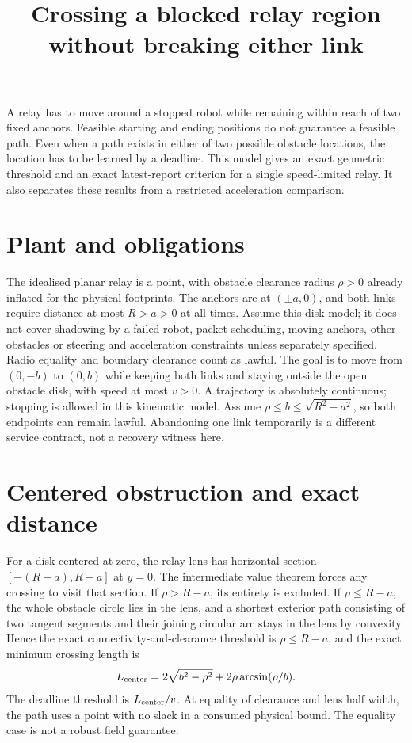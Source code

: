 \documentclass[11pt]{article}
\title{Crossing a blocked relay region without breaking either link}
\date{}
\begin{document}
\maketitle

A relay has to move around a stopped robot while remaining within reach
of two fixed anchors. Feasible starting and ending positions do not
guarantee a feasible path. Even when a path exists in either of two
possible obstacle locations, the location has to be learned by a
deadline. This model gives an exact geometric threshold and an exact
latest-report criterion for a single speed-limited relay. It also
separates these results from a restricted acceleration comparison.

\section{Plant and obligations}
The idealised planar relay is a point, with obstacle clearance radius
\(\rho>0\) already inflated for the physical footprints. The anchors
are at \((\pm a,0)\), and both links require distance at most \(R>a>0\)
at all times. Assume this disk model; it does not cover shadowing by a
failed robot, packet scheduling, moving anchors, other obstacles or
steering and acceleration constraints unless separately specified.
Radio equality and boundary clearance count as lawful. The goal is to
move from \((0,-b)\) to \((0,b)\) while keeping both links and staying
outside the open obstacle disk, with speed at most \(v>0\).
A trajectory is absolutely continuous; stopping is allowed in this
kinematic model. Assume \(\rho\leq b\leq\sqrt{R^2-a^2}\), so both
endpoints can remain lawful. Abandoning one link temporarily is a
different service contract, not a recovery witness here.

\section{Centered obstruction and exact distance}

For a disk centered at zero, the relay lens has horizontal section
\([-(R-a),R-a]\) at \(y=0\). The intermediate value theorem forces any
crossing to visit that section. If \(\rho>R-a\), its entirety is
excluded. If \(\rho\leq R-a\), the whole obstacle circle lies in the
lens, and a shortest exterior path consisting of two tangent segments
and their joining circular arc stays in the lens by convexity.
Hence the exact connectivity-and-clearance threshold is
\(\rho\leq R-a\), and the exact minimum crossing length is
\[
       L_{\rm center}
       =2\sqrt{b^2-\rho^2}+2\rho\arcsin(\rho/b).
\]
The deadline threshold is \(L_{\rm center}/v\). At equality of
clearance and lens half width, the path uses a point with no slack
in a consumed physical bound. The equality case is not a robust
field guarantee.
\end{document}
